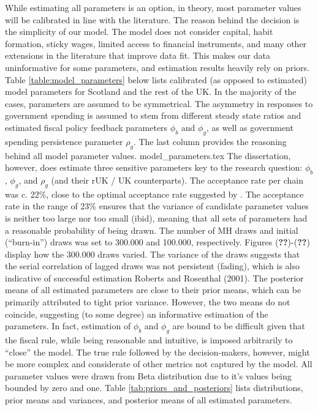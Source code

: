 While estimating all parameters is an option, in theory, most parameter values will be calibrated in line with the literature. The reason behind the decision is the simplicity of our model. The model does not consider capital, habit formation, sticky wages, limited access to financial instruments, and many other extensions in the literature that improve data fit. This makes our data uninformative for some parameters, and estimation results heavily rely on priors. Table \ref{table:model_parameters} below lists calibrated (as opposed to estimated) model parameters for Scotland and the rest of the UK. In the majority of the cases, parameters are assumed to be symmetrical. The asymmetry in responses to government spending is assumed to stem from different steady state ratios and estimated fiscal policy feedback parameters $\phi_b$ and $\phi_g$, as well as government spending persistence parameter $\rho_g$. The last column provides the reasoning behind all model parameter values.
{model_parameters.tex}
The dissertation, however, does estimate three sensitive parameters key to the research question: $\phi_b$, $\phi_g$, and $\rho_g$ (and their rUK / UK counterparts). The acceptance rate per chain was c. 22\%, close to the optimal acceptance rate suggested by \textcite{roberts_2001_optimal}. The acceptance rate in the range of 23\% ensures that the variance of candidate parameter values is neither too large nor too small (ibid), meaning that all sets of parameters had a reasonable probability of being drawn. The number of MH draws and initial (``burn-in'') draws was set to 300.000 and 100.000, respectively. Figures (\textbf{??})-(\textbf{??}) display how the 300.000 draws varied. The variance of the draws suggests that the serial correlation of lagged draws was not persistent (fading), which is also indicative of successful estimation Roberts and Rosenthal (2001). The posterior means of all estimated parameters are close to their prior means, which can be primarily attributed to tight prior variance. However, the two means do not coincide, suggesting (to some degree) an informative estimation of the parameters. In fact, estimation of $\phi_b$ and $\phi_g$ are bound to be difficult given that the fiscal rule, while being reasonable and intuitive, is imposed arbitrarily to ``close'' the model. The true rule followed by the decision-makers, however, might be more complex and considerate of other metrics not captured by the model. All parameter values were drawn from Beta distribution due to it's values being bounded by zero and one. Table \ref{tab:priors_and_posteriors} lists distributions, prior means and variances, and posterior means of all estimated parameters. 
